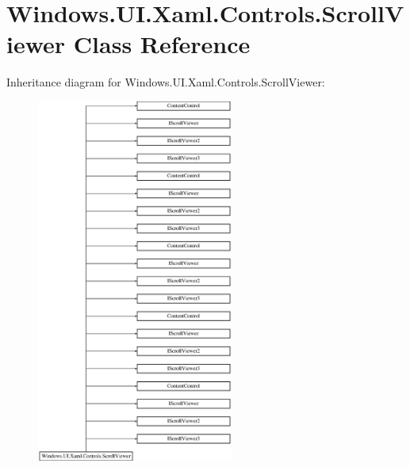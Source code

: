 \hypertarget{class_windows_1_1_u_i_1_1_xaml_1_1_controls_1_1_scroll_viewer}{}\section{Windows.\+U\+I.\+Xaml.\+Controls.\+Scroll\+Viewer Class Reference}
\label{class_windows_1_1_u_i_1_1_xaml_1_1_controls_1_1_scroll_viewer}
Inheritance diagram for Windows.\+U\+I.\+Xaml.\+Controls.\+Scroll\+Viewer\+:\begin{figure}[H]
\begin{center}
\leavevmode
\includegraphics[height=12.000000cm]{class_windows_1_1_u_i_1_1_xaml_1_1_controls_1_1_scroll_viewer}
\end{center}
\end{figure}
